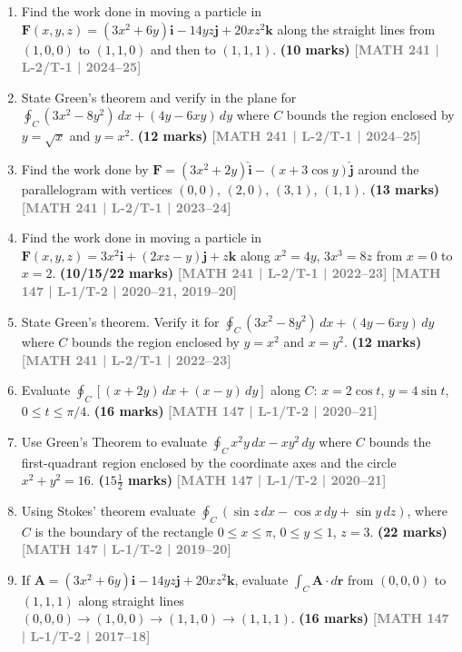 \documentclass[12pt]{article}
\newcommand{\yr}[1]{\hfill\textcolor{gray}{\small\textbf{[#1]}}}
\newcommand{\mk}[1]{\textcolor{orange!70!black}{\small\textbf{(#1 marks)}}}
\begin{document}
\begin{enumerate}
    
\item Find the work done in moving a particle in $\mathbf{F}(x,y,z)=(3x^{2}+6y)\mathbf{i}-14yz\mathbf{j}+20xz^{2}\mathbf{k}$ along the straight lines from $(1,0,0)$ to $(1,1,0)$ and then to $(1,1,1)$.
\mk{10} \yr{MATH 241 | L-2/T-1 | 2024--25}

\item State Green's theorem and verify in the plane for $\displaystyle\oint_{C}(3x^{2}-8y^{2})\,dx+(4y-6xy)\,dy$ where $C$ bounds the region enclosed by $y=\sqrt{x}$ and $y=x^{2}$.
\mk{12} \yr{MATH 241 | L-2/T-1 | 2024--25}

\item Find the work done by $\mathbf{F}=(3x^{2}+2y)\hat{\mathbf{i}}-(x+3\cos y)\hat{\mathbf{j}}$ around the parallelogram with vertices $(0,0)$, $(2,0)$, $(3,1)$, $(1,1)$.
\mk{13} \yr{MATH 241 | L-2/T-1 | 2023--24}

\item Find the work done in moving a particle in $\mathbf{F}(x,y,z)=3x^{2}\mathbf{i}+(2xz-y)\mathbf{j}+z\mathbf{k}$ along $x^{2}=4y$, $3x^{3}=8z$ from $x=0$ to $x=2$.
\mk{10/15/22} \yr{MATH 241 | L-2/T-1 | 2022--23} \yr{MATH 147 | L-1/T-2 | 2020--21, 2019--20}


\item State Green's theorem. Verify it for $\displaystyle\oint_{C}(3x^{2}-8y^{2})\,dx+(4y-6xy)\,dy$ where $C$ bounds the region enclosed by $y=x^{2}$ and $x=y^{2}$.
\mk{12} \yr{MATH 241 | L-2/T-1 | 2022--23}

\item Evaluate $\displaystyle\oint_{C}[(x+2y)\,dx+(x-y)\,dy]$ along $C$: $x=2\cos t$, $y=4\sin t$, $0\le t\le\pi/4$.
\mk{16} \yr{MATH 147 | L-1/T-2 | 2020--21}

\item Use Green's Theorem to evaluate $\displaystyle\oint_{C}x^{2}y\,dx-xy^{2}\,dy$ where $C$ bounds the first-quadrant region enclosed by the coordinate axes and the circle $x^{2}+y^{2}=16$.
\mk{$15\tfrac{1}{2}$} \yr{MATH 147 | L-1/T-2 | 2020--21}

\item Using Stokes' theorem evaluate $\oint_{C}(\sin z\,dx - \cos x\,dy + \sin y\,dz)$, where $C$ is the boundary of the rectangle $0\le x\le\pi$, $0\le y\le 1$, $z=3$.
\mk{22} \yr{MATH 147 | L-1/T-2 | 2019--20}

\item If $\mathbf{A}=(3x^{2}+6y)\mathbf{i}-14yz\mathbf{j}+20xz^{2}\mathbf{k}$, evaluate $\int_{C}\mathbf{A}\cdot d\mathbf{r}$ from $(0,0,0)$ to $(1,1,1)$ along straight lines $(0,0,0)\to(1,0,0)\to(1,1,0)\to(1,1,1)$.
\mk{16} \yr{MATH 147 | L-1/T-2 | 2017--18}


\end{enumerate}
\end{document}
